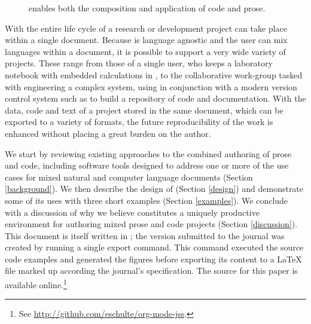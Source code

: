 \documentclass[article,shortnames]{jss}
\begin{document}
\begin{figure}[t!]
    \caption{ enables both the composition and
      application of code and prose.}
    \label{fig:overview}
  \end{figure}

With  the entire life cycle of a research or development
project can take place within a single document.  Because  is
language agnostic and the user can mix languages within a document, it
is possible to support a very wide variety of projects.  These range
from those of a single user, who keeps a laboratory notebook
with embedded calculations in , to the collaborative
work-group tasked with engineering a complex system, using
 in conjunction with a modern version control system such as
 to build a repository of code and documentation.  With the
data, code and text of a project stored in the same document, which can
be exported to a variety of formats, the future reproducibility of the
work is enhanced without placing a great burden on the
author.

We start by reviewing existing approaches to the combined authoring of
prose and code, including software tools designed to address one or
more of the use cases for mixed natural and computer language
documents (Section \ref{background}).  We then describe the design of
 (Section \ref{design}) and demonstrate some of its uses with
three short examples (Section \ref{examples}).  We conclude with a
discussion of why we believe  constitutes a uniquely
productive environment for authoring mixed prose and code projects
(Section \ref{discussion}).  This document is itself written in
; the version submitted to the journal was created by running
a single export command.  This command executed the source code
examples and generated the figures before exporting its content to a
\LaTeX{} file marked up according the journal's specification. The
 source for this paper is available online.\footnote{See \href{http://github.com/eschulte/org-mode-jss}{http://github.com/eschulte/org-mode-jss}. }
\end{document}
